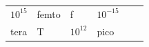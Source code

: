 {{\begin{center}
\begin{tabular}[t]{|l|l|l|l|l|l|}
                \begin{math}{10}^{15}\end{math}
               &
    
    
        femto &
    
    
        f &
    
    
        
                \begin{math}{10}^{-15}\end{math}
     \tabularnewline\cline{1-1}\cline{2-2}\cline{3-3}\cline{4-4}\cline{5-5}\cline{6-6}
    
    
        tera &
    
    
        T &
    
    
        
                \begin{math}{10}^{12}\end{math}
               &
    
    
        pico &
    

\end{tabular}
\end{center}}}
